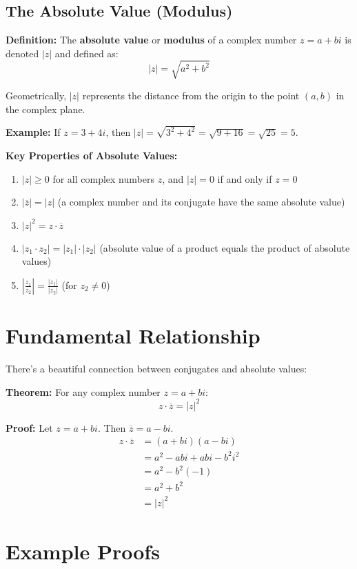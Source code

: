\documentclass[12pt]{article}
\begin{document}
\subsection{The Absolute Value (Modulus)}

\textbf{Definition:} The \textbf{absolute value} or \textbf{modulus} of a complex number $z = a + bi$ is denoted $|z|$ and defined as:
$$|z| = \sqrt{a^2 + b^2}$$

Geometrically, $|z|$ represents the distance from the origin to the point $(a, b)$ in the complex plane.

\textbf{Example:} If $z = 3 + 4i$, then $|z| = \sqrt{3^2 + 4^2} = \sqrt{9 + 16} = \sqrt{25} = 5$.

\textbf{Key Properties of Absolute Values:}
\begin{enumerate}
\item $|z| \geq 0$ for all complex numbers $z$, and $|z| = 0$ if and only if $z = 0$
\item $|\overline{z}| = |z|$ (a complex number and its conjugate have the same absolute value)
\item $|z|^2 = z \cdot \overline{z}$
\item $|z_1 \cdot z_2| = |z_1| \cdot |z_2|$ (absolute value of a product equals the product of absolute values)
\item $\left|\frac{z_1}{z_2}\right| = \frac{|z_1|}{|z_2|}$ (for $z_2 \neq 0$)
\end{enumerate}

\section{Fundamental Relationship}

There's a beautiful connection between conjugates and absolute values:

\textbf{Theorem:} For any complex number $z = a + bi$:
$$z \cdot \overline{z} = |z|^2$$

\textbf{Proof:} Let $z = a + bi$. Then $\overline{z} = a - bi$.
\begin{align}
z \cdot \overline{z} &= (a + bi)(a - bi) \\
&= a^2 - abi + abi - b^2i^2 \\
&= a^2 - b^2(-1) \\
&= a^2 + b^2 \\
&= |z|^2
\end{align}

\section{Example Proofs}
\end{document}
